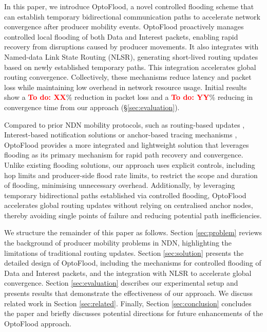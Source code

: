 \documentclass[10pt,conference]{IEEEtran}
\newcommand{\todo}[1]{\textbf{\textcolor{red}{To do: #1}}}
\begin{document}
In this paper, we introduce OptoFlood, a novel controlled flooding scheme that can establish temporary bidirectional communication paths to accelerate network convergence after producer mobility events. OptoFlood proactively manages controlled local flooding of both Data and Interest packets, enabling rapid recovery from disruptions caused by producer movements. 
It also integrates
with Named-data Link State Routing (NLSR), generating short-lived routing updates based on newly established temporary paths. This integration accelerates global routing convergence. Collectively, these mechanisms reduce latency and packet loss while maintaining low overhead in network resource usage.
Initial results show a \todo{XX}\% reduction in packet loss and a \todo{YY}\% reducing in convergence time from our approach (\S\ref{sec:evaluation}).

Compared to prior NDN mobility protocols, such as routing-based updates \cite{meddeb:2018:afirm}, Interest-based notification solutions \cite{auge:2016:map-me} or anchor-based tracing mechanisms \cite{zhang:2018:kite},
OptoFlood provides a more integrated and lightweight solution that leverages flooding as its primary mechanism for rapid path recovery and convergence. Unlike existing flooding solutions, our approach uses explicit controls, including hop limits and producer-side flood rate limits, to restrict the scope and duration of flooding, minimising unnecessary overhead. Additionally, by leveraging temporary bidirectional paths established via controlled flooding, OptoFlood accelerates global routing updates without relying on centralised anchor nodes, thereby avoiding single points of failure and reducing potential path inefficiencies.

We structure the remainder of this paper as follows. Section \ref{sec:problem} reviews the background of producer mobility problems in NDN, highlighting the limitations of traditional routing updates. Section \ref{sec:solution} presents the detailed design of OptoFlood, including the mechanisms for controlled flooding of Data and Interest packets, and the integration with NLSR to accelerate global convergence. Section \ref{sec:evaluation} describes our experimental setup and presents results that demonstrate the effectiveness of our approach. 
We discuss related work in Section \ref{sec:related}.
Finally, Section \ref{sec:conclusion} concludes the paper and briefly discusses potential directions for future enhancements of the OptoFlood approach.
\end{document}
